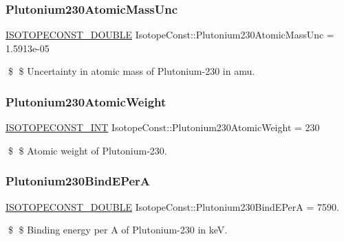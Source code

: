 \subsubsection{\texorpdfstring{Plutonium230\+Atomic\+Mass\+Unc}{Plutonium230AtomicMassUnc}}
{\footnotesize\ttfamily \mbox{\hyperlink{group___isotope_const-_macros_ga8f45a7272ce02c0b4c65c44636ed719a}{I\+S\+O\+T\+O\+P\+E\+C\+O\+N\+S\+T\+\_\+\+D\+O\+U\+B\+LE}} Isotope\+Const\+::\+Plutonium230\+Atomic\+Mass\+Unc = 1.\+5913e-\/05}

\$ \$ Uncertainty in atomic mass of Plutonium-\/230 in amu. \mbox{\label{group___isotope_const-_plutonium-_pu230_gab69f111c48c991b313814b9960d26840}} 
\subsubsection{\texorpdfstring{Plutonium230\+Atomic\+Weight}{Plutonium230AtomicWeight}}
{\footnotesize\ttfamily \mbox{\hyperlink{group___isotope_const-_macros_ga5f18360b3e99483a35c32d789e62621c}{I\+S\+O\+T\+O\+P\+E\+C\+O\+N\+S\+T\+\_\+\+I\+NT}} Isotope\+Const\+::\+Plutonium230\+Atomic\+Weight = 230}

\$ \$ Atomic weight of Plutonium-\/230. \mbox{\label{group___isotope_const-_plutonium-_pu230_ga8b831aa1cf4ae974661d18bb4797aca0}} 
\subsubsection{\texorpdfstring{Plutonium230\+Bind\+E\+PerA}{Plutonium230BindEPerA}}
{\footnotesize\ttfamily \mbox{\hyperlink{group___isotope_const-_macros_ga8f45a7272ce02c0b4c65c44636ed719a}{I\+S\+O\+T\+O\+P\+E\+C\+O\+N\+S\+T\+\_\+\+D\+O\+U\+B\+LE}} Isotope\+Const\+::\+Plutonium230\+Bind\+E\+PerA = 7590.}

\$ \$ Binding energy per A of Plutonium-\/230 in keV. \mbox{\label{group___isotope_const-_plutonium-_pu230_ga8803b7affe52ac0c9a71e90954436a2f}} 
